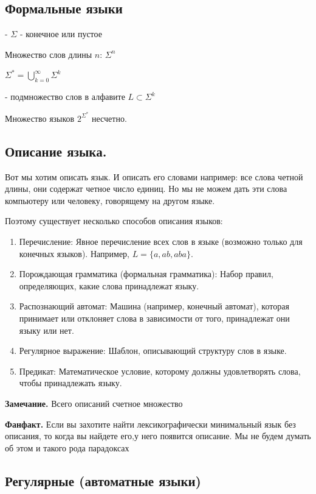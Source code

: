 \subsection{Формальные языки}

 - $\Sigma$ - конечное или пустое

Множество слов длины $n$: $\Sigma^n$ 

$\Sigma^*=\bigcup\limits_{k=0}^\infty \Sigma^k$

 - подмножество слов в алфавите $L \subset \Sigma^k$

 Множество языков $2^{\Sigma^* }$ несчетно.

\subsection{Описание языка.}

Вот мы хотим описать язык. И описать его словами например: все слова четной длины, они содержат четное число единиц. Но мы не можем дать эти слова компьютеру или человеку, говорящему на другом языке. 

Поэтому существует несколько способов описания языков:
\begin{enumerate}
    \item Перечисление: Явное перечисление всех слов в языке (возможно только для конечных языков). Например, $L = \{a, ab, aba\}$.
    \item Порождающая грамматика (формальная грамматика): Набор правил, определяющих, какие слова принадлежат языку.
    \item Распознающий автомат: Машина (например, конечный автомат), которая принимает или отклоняет слова в зависимости от того, принадлежат они языку или нет.
    \item Регулярное выражение: Шаблон, описывающий структуру слов в языке.
    \item  Предикат: Математическое условие, которому должны удовлетворять слова, чтобы принадлежать языку. 
\end{enumerate}

\textbf{Замечание.} Всего описаний счетное множество

\textbf{Фанфакт.} Если вы захотите найти лексикографически минимальный язык без описания, то когда вы найдете его,у него появится описание. Мы не будем думать об этом и такого рода парадоксах

\subsection{Регулярные (автоматные языки)}

